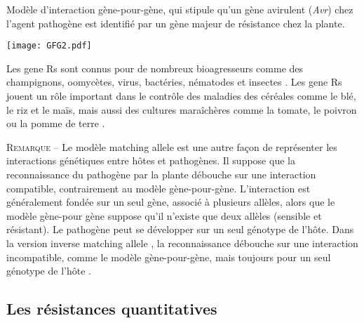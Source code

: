 	
	 \begin{table}[ht]
	    \centering
		  \caption[Modèle d’interaction gène-pour-gène]{Modèle d’interaction gène-pour-gène, 
		           qui stipule qu'un gène 
	     	       avirulent (\textit{Avr}) chez l’agent pathogène est identifié
		           par un gène majeur de résistance  chez la plante.}
		  \label{tab:GFG}
		  \texttt{[image: GFG2.pdf]}  
	 \end{table}
		
	 
	Les \glspl{gene R} sont connus pour de nombreux bioagresseurs  comme des  champignons, oomycètes, virus, bactéries, nématodes et insectes \citep{Dangl2001}. Les  \glspl{gene R}    jouent un rôle important dans le contrôle des maladies 
des céréales comme le blé, le riz et le maïs, mais aussi des cultures maraîchères comme la tomate,
le poivron ou la pomme de terre \citep{Ballvora2002, Hammond-Kosack1997,Schmidt2010, Stuthman2007, Gururani2012, Seid2015,  Pilet2005}.

{\small\medskip \textsc{Remarque --} Le modèle \og matching allele \fg{} est une autre façon de représenter les interactions génétiques entre hôtes et pathogènes. Il suppose que la reconnaissance du pathogène par la plante débouche sur une interaction  compatible, contrairement au modèle gène-pour-gène. L'interaction est généralement fondée sur un seul gène, associé à plusieurs allèles, alors que le modèle gène-pour gène suppose qu'il n'existe que deux allèles (sensible et résistant). Le pathogène peut se développer sur un seul génotype de l'hôte. Dans la version \og inverse matching allele \fg{}, la reconnaissance débouche sur une interaction incompatible, comme le modèle gène-pour-gène, mais toujours pour un seul génotype de l'hôte \citep{Thrall2016}.}


\subsection{Les résistances quantitatives} \label{sec:quantitatives}

